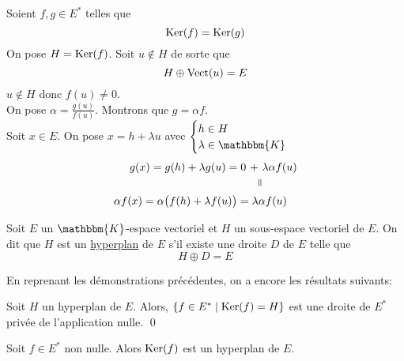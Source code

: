 \begin{prv}
	Soient $f, g \in E^*$ telles que \[
		\operatorname{Ker}(f) = \operatorname{Ker}(g)
	\] On pose $H = \operatorname{Ker}(f)$. Soit $u \not\in H$ de sorte que \[
		H \oplus \operatorname{Vect}(u) = E
	\] $u \not\in H$ donc $f(u) \neq 0$.\\
	On pose $\alpha = \frac{g(u)}{f(u)}$. Montrons que $g = \alpha f$.\\
	Soit $x \in E$. On pose $x = h + \lambda u$ avec $\begin{cases}
		h \in H\\
		\lambda \in \mathbbm{K}
	\end{cases}$ \\
	\begin{align*}
		g(x) = g(h) + \lambda g(u) = 0\ +&\ \lambda \alpha f(u)\\
		&\vrt=\\
		\alpha f(x) = \alpha\big(f(h) + \lambda f(u)\big) = \lambda&\alpha f(u)
	\end{align*}
\end{prv}

\begin{defn}
	Soit $E$ un $\mathbbm{K}$-espace vectoriel et $H$ un sous-espace vectoriel de $E$. On dit que $H$ est un \underline{hyperplan} de $E$ s'il existe une droite $D$ de $E$ telle que \[
		H \oplus D = E
	\]
\end{defn}

En reprenant les démonstrations précédentes, on a encore les résultats suivants: \\[3mm]

\begin{prop}
	Soit $H$ un hyperplan de $E$. Alors, $\{f \in E^* \mid \operatorname{Ker}(f) = H\}$ est une droite de $E^*$ privée de l'application nulle. \qed
\end{prop}

\begin{prop}
	Soit $f \in E^*$ non nulle. Alors $\operatorname{Ker}(f)$ est un hyperplan de $E$.
\end{prop}

